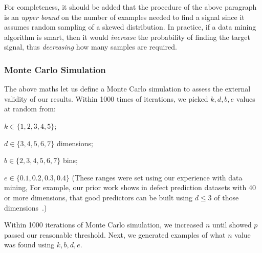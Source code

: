 For completeness, it should be added  that the procedure of the above paragraph is an {\em upper bound} on the
number of examples needed to find a signal since it
assumes random sampling of a skewed distribution. In
practice, if a data mining algorithm is smart, then
it would {\em increase} the probability of finding
the target signal, thus {\em decreasing} how many samples are required.

\subsubsection{Monte Carlo Simulation}
    The above maths let  us define
    a  Monte Carlo simulation to assess the external validity of our results.
    Within 1000 times of iterations, we picked $k,d,b,e$ values at random from:
    \squishlist
      \item $k \in \{1,2,3,4,5\}$;
  \item $d \in \{3,4,5,6,7\}$ dimensions;
  \item $b \in \{2,3,4,5,6,7\}$ bins; 
    \item $e\in \{0.1,0.2,0.3,0.4\}$
      \squishend
      (These ranges were set using our experience with data mining, For example, our prior work shows in defect prediction datasets
      with 40 or more dimensions, that good predictors can be built using $d\le 3$ of those dimensions~\cite{Menzies07}.)
      
     Within 1000 iterations of Monte Carlo simulation,
     we increased $n$ until  showed  $p$ passed our reasonable threshold.
     Next, we generated examples of what $n$ value was found using  $k,b,d,e$.
     
